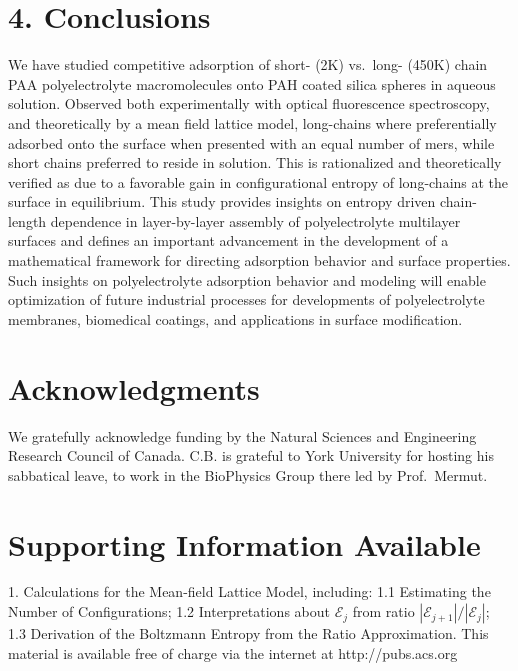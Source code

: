 \documentclass[journal=mamobx,manuscript=article]{achemso}
\begin{document}



\section{4. Conclusions}
   \label{sec-conc}

We have studied competitive adsorption of short- (2K) vs.\ long- (450K) chain PAA polyelectrolyte macromolecules onto PAH coated silica spheres in aqueous solution. Observed both experimentally with optical fluorescence spectroscopy, and theoretically by a mean field lattice model, long-chains where preferentially adsorbed onto the surface when presented with an equal number of mers, while short chains preferred to reside in solution. This is rationalized and theoretically verified as due to a favorable gain in configurational entropy of long-chains at the surface in equilibrium. This study provides insights on entropy driven chain-length dependence in layer-by-layer assembly of polyelectrolyte multilayer surfaces and defines an important advancement in the development of a mathematical framework for directing adsorption behavior and surface properties. Such insights on polyelectrolyte adsorption behavior and modeling will enable optimization of future industrial processes for developments of polyelectrolyte membranes, biomedical coatings, and applications in surface modification.


\section{Acknowledgments}
We gratefully acknowledge funding by the Natural 
Sciences and Engineering Research Council of Canada.
C.B. is grateful to York University for hosting his sabbatical leave, to work in the BioPhysics Group there led by Prof.\ Mermut.

\section{Supporting Information Available}
1.  Calculations for the Mean-field Lattice Model, 
including: 1.1 Estimating the Number of Configurations;
1.2 Interpretations about $\mathcal{E}_j$ from 
ratio $|\mathcal{E}_{j+1}|/|\mathcal{E}_j|$;
1.3 Derivation of the Boltzmann Entropy from the 
Ratio Approximation.  This material is available free of
charge via the internet at  http://pubs.acs.org


\end{document}
